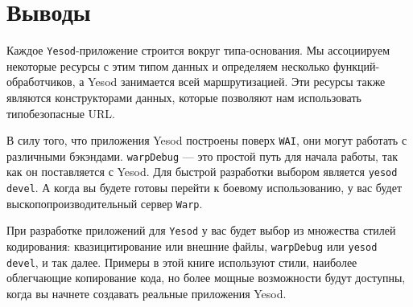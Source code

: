 \section{Выводы}

Каждое \texttt{Yesod}-приложение строится вокруг типа-основания.  Мы ассоциируем некоторые
ресурсы с этим типом данных и определяем несколько функций-обработчиков, а Yesod
занимается всей маршрутизацией. Эти ресурсы также являются конструкторами данных, которые
позволяют нам использовать типобезопасные URL.

В силу того, что приложения Yesod построены поверх \texttt{WAI}, они могут работать с
различными бэкэндами. \lstinline!warpDebug! --- это простой путь для начала работы, так
как он поставляется с Yesod. Для быстрой разработки выбором является \lstinline!yesod
devel!. А когда вы будете готовы перейти к боевому использованию, у вас будет
выскопопроизводительный сервер \texttt{Warp}.

При разработке приложений для \texttt{Yesod} у вас будет выбор из множества стилей
кодирования: квазицитирование или внешние файлы, \lstinline{warpDebug} или
\lstinline'yesod devel', и так далее. Примеры в этой книге используют стили, наиболее
облегчающие копирование кода, но более мощные возможности будут доступны, когда вы начнете
создавать реальные приложения Yesod.
